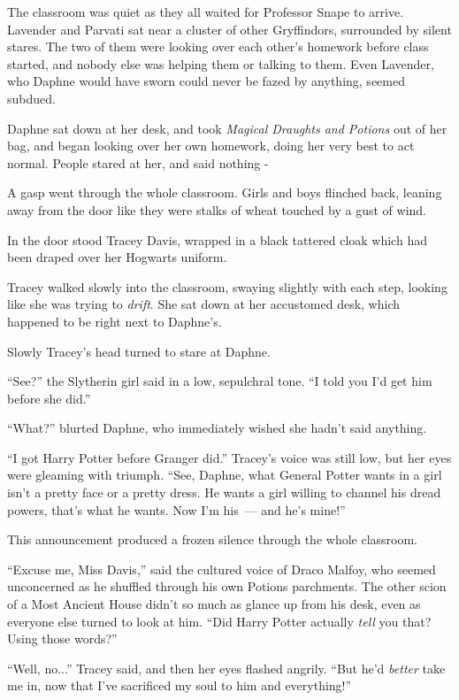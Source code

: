 The classroom was quiet as they all waited for Professor Snape to arrive. Lavender and Parvati sat near a cluster of other Gryffindors, surrounded by silent stares. The two of them were looking over each other's homework before class started, and nobody else was helping them or talking to them. Even Lavender, who Daphne would have sworn could never be fazed by anything, seemed subdued.

Daphne sat down at her desk, and took \emph{Magical Draughts and Potions} out of her bag, and began looking over her own homework, doing her very best to act normal. People stared at her, and said nothing -

A gasp went through the whole classroom. Girls and boys flinched back, leaning away from the door like they were stalks of wheat touched by a gust of wind.

In the door stood Tracey Davis, wrapped in a black tattered cloak which had been draped over her Hogwarts uniform.

Tracey walked slowly into the classroom, swaying slightly with each step, looking like she was trying to \emph{drift}. She sat down at her accustomed desk, which happened to be right next to Daphne's.

Slowly Tracey's head turned to stare at Daphne.

``See?'' the Slytherin girl said in a low, sepulchral tone. ``I told you I'd get him before she did.''

``What?'' blurted Daphne, who immediately wished she hadn't said anything.

``I got Harry Potter before Granger did.'' Tracey's voice was still low, but her eyes were gleaming with triumph. ``See, Daphne, what General Potter wants in a girl isn't a pretty face or a pretty dress. He wants a girl willing to channel his dread powers, that's what he wants. Now I'm his~--- and he's mine!''

This announcement produced a frozen silence through the whole classroom.

``Excuse me, Miss Davis,'' said the cultured voice of Draco Malfoy, who seemed unconcerned as he shuffled through his own Potions parchments. The other scion of a Most Ancient House didn't so much as glance up from his desk, even as everyone else turned to look at him. ``Did Harry Potter actually \emph{tell} you that? Using those words?''

``Well, no...'' Tracey said, and then her eyes flashed angrily. ``But he'd \emph{better} take me in, now that I've sacrificed my soul to him and everything!''

